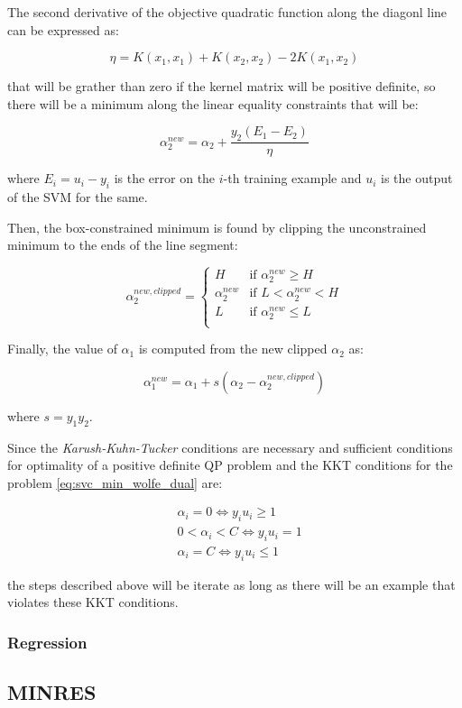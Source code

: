 The second derivative of the objective quadratic function along the diagonl line can be expressed as:

\begin{equation} \label{eq:smo_eta}
\eta = K(x_1, x_1) + K(x_2, x_2) - 2K(x_1, x_2)
\end{equation}

that will be grather than zero if the kernel matrix will be positive definite, so there will be a minimum along the linear equality constraints that will be:

\begin{equation} \label{eq:smo_a_2_new}
	\alpha_2^{new} = \alpha_2 + \frac{y_2(E_1 - E_2)}{\eta}
\end{equation}

where $E_i = u_i - y_i$ is the error on the $i$-th training example and $u_i$ is the output of the SVM for the same.

Then, the box-constrained minimum is found by clipping the unconstrained minimum to the ends of the line segment:

\begin{equation} \label{eq:smo_a_2_new_clipped}
    \alpha_2^{new,clipped} =
        \begin{cases}
            H & \text{if } \alpha_2^{new} \geq H \\
            \alpha_2^{new} & \text{if } L < \alpha_2^{new} < H \\
            L & \text{if } \alpha_2^{new} \leq L \\
        \end{cases}
\end{equation}

Finally, the value of $\alpha_1$ is computed from the new clipped $\alpha_2$ as:

\begin{equation} \label{eq:smo_a_1_new}
	\alpha_1^{new} = \alpha_1 + s (\alpha_2 - \alpha_2^{new,clipped})
\end{equation}

where $s = y_1 y_2$.

Since the \emph{Karush-Kuhn-Tucker} conditions are necessary and sufficient conditions for optimality of a positive definite QP problem and the KKT conditions for the problem \ref{eq:svc_min_wolfe_dual} are:

\begin{equation} \label{eq:smo_kkt}
	\begin{aligned}
		& \alpha_i = 0 \Leftrightarrow y_i u_i \geq 1 \\
		& 0 < \alpha_i < C \Leftrightarrow y_i u_i = 1 \\
		& \alpha_i = C \Leftrightarrow y_i u_i \leq 1
	\end{aligned}
\end{equation}

the steps described above will be iterate as long as there will be an example that violates these KKT conditions.

\subsubsection{Regression}

\pagebreak

\subsection{MINRES}